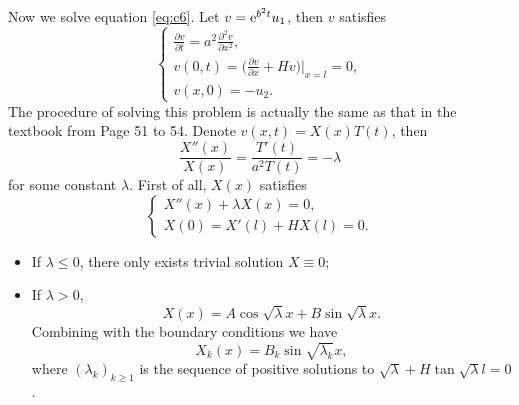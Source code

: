 \begin{solution}
    Now we solve equation \eqref{eq:c6}. Let $v = \mathrm{e}^{b^2 t}u_1$, then $v$ satisfies
    \begin{equation}\label{eq:c10}
      \begin{cases}
        \frac{\partial v}{\partial t} = a^2 \frac{\partial^2 v}{\partial x^2}, \\
        v(0,t) = \bigl(\frac{\partial v}{\partial x} + Hv\bigr)\big|_{x=l} = 0, \\
        v(x,0) = -u_2.
      \end{cases}      
    \end{equation}
    The procedure of solving this problem is actually the same as that in the textbook
    from Page 51 to 54.
    Denote $v(x,t) = X(x)T(t)$, then
    \[ \frac{X''(x)}{X(x)} = \frac{T'(t)}{a^2 T(t)} = -\lambda \]
    for some constant $\lambda$. First of all, $X(x)$ satisfies
    \begin{equation}\label{eq:c11}
      \begin{cases}
        X''(x) + \lambda X(x) = 0, \\
        X(0) = X'(l) + HX(l) = 0.
      \end{cases}
    \end{equation}
    \begin{itemize}
      \item If $\lambda\leq 0$, there only exists trivial solution $X\equiv 0$;
      \item If $\lambda>0$,
        \begin{equation}\label{eq:c12}
          X(x) = A\cos\sqrt{\lambda}x + B\sin\sqrt{\lambda}x.
        \end{equation}
        Combining with the boundary conditions we have
        \begin{equation}\label{eq:c13}
          X_k(x) = B_k \sin\sqrt{\lambda_k} x,
        \end{equation}
        where $(\lambda_k)_{k\geq 1}$ is the sequence of positive solutions to
        $\sqrt\lambda + H\tan\sqrt\lambda l = 0$.
    \end{itemize}


\end{solution}
